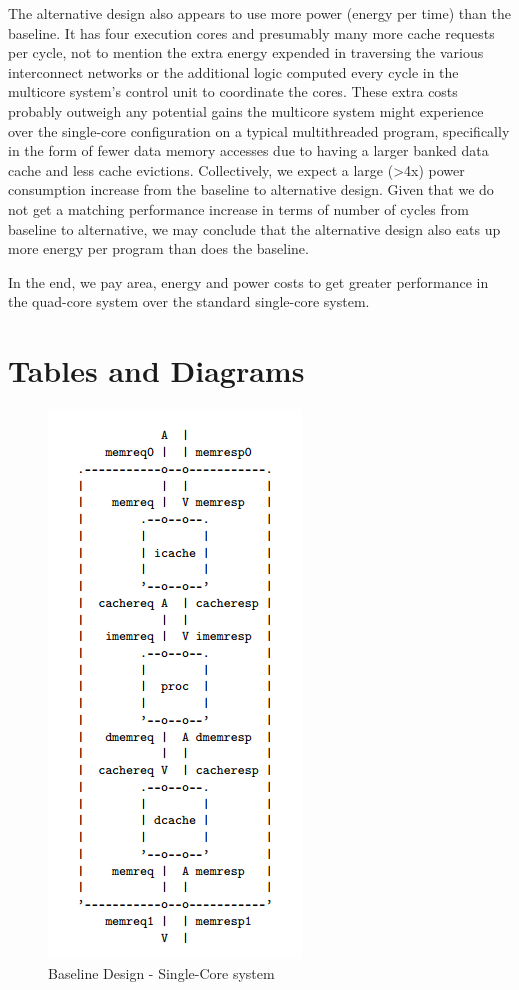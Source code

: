 \documentclass[10pt]{article}
\begin{document}
The alternative design also appears to use more power (energy per time) than the baseline. It has four execution cores and presumably many more cache requests per cycle, not to mention the extra energy expended in traversing the various interconnect networks or the additional logic computed every cycle in the multicore system's control unit to coordinate the cores. These extra costs probably outweigh any potential gains the multicore system might experience over the single-core configuration on a typical multithreaded program, specifically in the form of fewer data memory accesses due to having a larger banked data cache and less cache evictions. Collectively, we expect a large (>4x) power consumption increase from the baseline to alternative design. Given that we do not get a matching performance increase in terms of number of cycles from baseline to alternative, we may conclude that the alternative design also eats up more energy per program than does the baseline.

In the end, we pay area, energy and power costs to get greater performance in the quad-core system over the standard single-core system.



\newpage
\section {Tables and Diagrams}


\begin{figure}[H]
	\centering
	\includegraphics{bline_diag}
	\caption{Baseline Design - Single-Core system}
	\label{fig:bline}
\end{figure}
\end{document}
